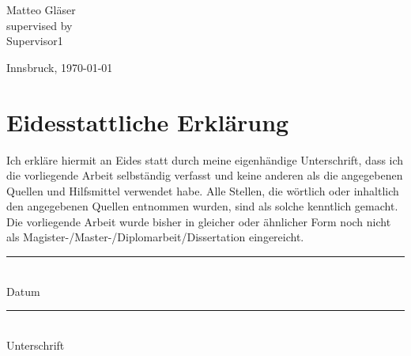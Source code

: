 \documentclass[11pt,a4paper,titlepage, twoside]{report}
\makeatletter
\def\cleardoublepage{\clearpage\if@twoside \ifodd\c@page\else
    \hbox{}
    \thispagestyle{empty}
    \newpage
    \if@twocolumn\hbox{}\newpage\fi\fi\fi}
\makeatother
\begin{document}
\begin{titlepage}
\begin{center}
Matteo Gläser\\[30mm]


supervised by\\
Supervisor1\\[10mm]

\begin{footnotesize}Innsbruck, \today \end{footnotesize}
\end{center}
\end{titlepage}


\cleardoublepage
{}
\thispagestyle{empty}

\section*{Eidesstattliche Erklärung}
Ich erkläre hiermit an Eides statt durch meine eigenhändige Unterschrift, dass ich die vorliegende Arbeit selbständig verfasst und keine anderen als die angegebenen Quellen und Hilfsmittel verwendet habe.
Alle Stellen, die wörtlich oder inhaltlich den angegebenen Quellen entnommen wurden, sind als solche kenntlich gemacht.\\

Die vorliegende Arbeit wurde bisher in gleicher oder ähnlicher Form noch nicht als Magister-/Master-/Diplomarbeit/Dissertation eingereicht.\\[3cm]

\begin{minipage}{0.4\textwidth}
  \centering
  \rule{\textwidth}{.4pt}\\
  Datum
\end{minipage}%
\hfill%
\begin{minipage}{0.4\textwidth}
  \centering
  \rule{\textwidth}{.4pt}\\
  Unterschrift
\end{minipage}



\cleardoublepage
{}
\begin{abstract}
This is the English abstract.
\end{abstract}
\end{document}
